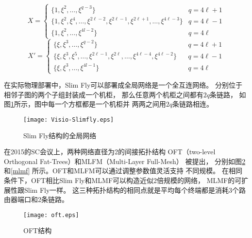 \begin{equation}\label{equ:generator-sets0}
  X=
  \begin{cases}
    \{1,\xi^2,\ldots,\xi^{q-3}\}& q=4 \ell+1 \\
    \{1,\xi^2,\xi^4,\ldots, \xi^{2\ell-2},\xi^{2\ell-1},\xi^{2\ell+1},\ldots, \xi^{4\ell-3}\} & q=4 \ell-1 \\
    \{1,\xi^2,\ldots,\xi^{4l-2}\} & q=4 \ell
  \end{cases}
\end{equation}
\begin{equation}\label{equ:generator-sets1}
  X'=
  \begin{cases}
    \{\xi,\xi^3,\ldots,\xi^{q-2}\} & q=4 \ell+1 \\
    \{\xi,\xi^3,\xi^5,\ldots,\xi^{2\ell-1}, \xi^{2\ell},\ldots,\xi^{4\ell-4},\xi^{4\ell-2}\}\ \ \ \  & q=4 \ell-1 \\
    \{\xi,\xi^3,\ldots,\xi^{4l-1}\} & q=4 \ell
  \end{cases}
\end{equation}

在实际物理部署中，Slim Fly可以部署成全局网络是一个全互连网络。
分别位于相邻子图的两个子组封装成一个机柜，
那么任意两个机柜之间都有$2q$条链路，
如图\ref{slimfly}所示，图中每一个方框都是一个机柜并
两两之间用$2q$条链路相连。

\begin{figure}[htp]
  \centering
    \texttt{[image: Visio-Slimfly.eps]}
    \caption{Slim Fly结构的全局网络}
    \label{slimfly}
\end{figure}

在2015的SC会议上，两种网络直径为2的间接拓扑结构
OFT（two-level Orthogonal Fat-Trees）和MLFM（Multi-Layer Full-Mesh）
被提出，
分别如图\ref{oft}和\ref{mlmf} 所示。OFT和MLFM可以通过调整参数值灵活支持
不同规模。
在相同条件下，OFT相比Slim Fly和MLMF可以构造近似2倍规模的网络，
MLMF的可扩展性跟Slim Fly一样。
这三种拓扑结构的相同点就是平均每个终端都是消耗3个路由器端口和2条链路。

\begin{figure}[htp]
  \centering
    \texttt{[image: oft.eps]}
    \caption{OFT结构}
    \label{oft}
\end{figure}

